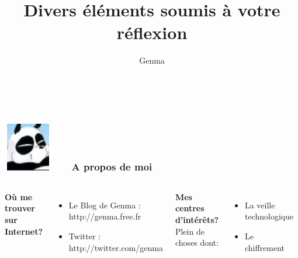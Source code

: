 \documentclass{beamer}
\title[Divers éléments soumis à votre réflexion]{Divers éléments soumis à votre réflexion}
\author{Genma}
\begin{document}
\begin{frame}
	\titlepage
	\vfill
	\begin{center}
		\\[2.5ex]
		{\tiny\CcNote{\CcLongnameByNcSa}}
		\vspace*{-2.5ex}
	\end{center}
\end{frame}



\begin{frame}
\frametitle{\includegraphics[scale=0.4]{./images/Genma.jpg} \ \ \  A propos de moi  }
\begin{columns}[c] 

\textbf{Où me trouver sur Internet?}
\begin{itemize}
\item Le Blog de Genma : http://genma.free.fr
\item Twitter : http://twitter.com/genma
\end{itemize}

\textbf{Mes centres d'intérêts?}
\\ Plein de choses dont:
\begin{itemize}
\item La veille technologique
\item Le chiffrement
\end{itemize}
\includegraphics[width=5cm,height=5cm]{./images/blog.png} 
\end{columns}
\end{frame}
\end{document}
